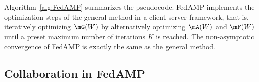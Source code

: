 
Algorithm~\ref{alg:FedAMP} summarizes the pseudocode. 
FedAMP implements the optimization steps of the general method in a client-server framework, that is, iteratively optimizing $\mG(W)$ by alternatively optimizing $\mA(W)$ and $\mF(W)$ until a preset maximum number of iterations $K$ is reached.
The non-asymptotic convergence of FedAMP is exactly the same as the general method.


\subsection{Collaboration in FedAMP}




